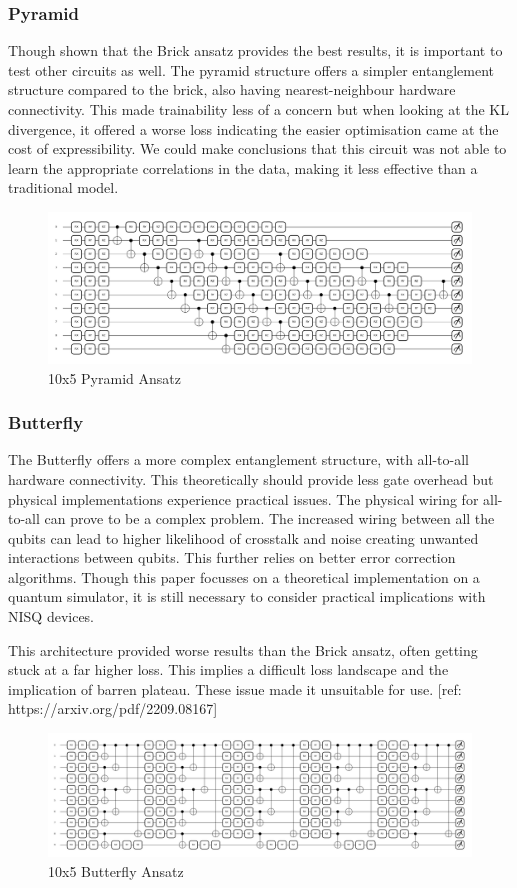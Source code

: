 \documentclass[12pt]{article}
\newcommand{\newp}
    {
    \vskip 0.5cm 
  }
\numberwithin{equation}{section}
\begin{document}
\subsubsection{Pyramid}
Though shown that the Brick ansatz provides the best results, it is important to 
test other circuits as well. The pyramid structure offers a simpler entanglement 
structure compared to the brick, also having nearest-neighbour hardware 
connectivity. This made trainability less of a concern but 
when looking at the KL divergence, it offered a worse loss indicating the 
easier optimisation came at the cost of expressibility. We could make conclusions 
that this circuit was not able to learn the appropriate correlations in the data,
making it less effective than a traditional model. 
\begin{figure}[h!]
  \centering 
  \includegraphics[width=\linewidth]{ten5pyramid.png}
  \caption{10x5 Pyramid Ansatz}
  \label{fig:pyramid}
\end{figure}

\newpage
\subsubsection{Butterfly}
The Butterfly offers a more complex entanglement structure, with all-to-all hardware 
connectivity. This theoretically should provide less gate overhead but physical 
implementations experience practical issues. The physical wiring for all-to-all 
can prove to be a complex problem. The increased wiring between all the qubits 
can lead to higher likelihood of crosstalk and noise creating unwanted interactions 
between qubits. This further relies on better error correction algorithms. Though 
this paper focusses on a theoretical implementation on a quantum simulator, it 
is still necessary to consider practical implications with NISQ devices. 
\newp
This architecture provided worse results than the Brick ansatz, often getting 
stuck at a far higher loss. This implies a difficult loss landscape and the 
implication of barren plateau. These issue made it unsuitable for use. 
[ref: https://arxiv.org/pdf/2209.08167]
\begin{figure}[h!]
  \centering 
  \includegraphics[width=\linewidth]{ten5butterfly.png}
  \caption{10x5 Butterfly Ansatz}
  \label{fig:butterfly}
\end{figure}
\newpage
\end{document}
